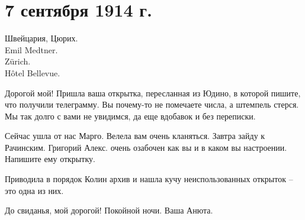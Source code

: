 \section{7 сентября 1914 г.}


Швейцария, Цюрих. \\
Emil Medtner. \\
Zürich. \\
Hôtel Bellevue.


Дорогой мой! Пришла ваша открытка, пересланная из Юдино, в которой пишите, что
получили телеграмму. Вы почему-то не помечаете числа, а штемпель стерся. Мы так
долго с вами не увидимся, да еще вдобавок и без переписки.

Сейчас ушла от нас Марго. Велела вам очень кланяться. Завтра зайду к Рачинским.
Григорий Алекс. очень озабочен как вы и в каком вы настроении. Напишите ему
открытку.

Приводила в порядок Колин архив и нашла кучу неиспользованных открыток -- это
одна из них.

До свиданья, мой дорогой! Покойной ночи. Ваша Анюта.
